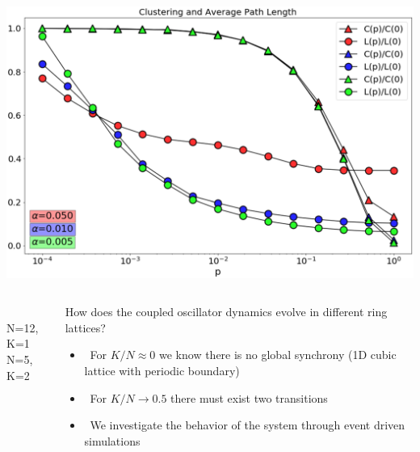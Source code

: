 \documentclass[serif,mathserif]{beamer}
\begin{document}
\begin{frame}
    \centering
    \includegraphics[height=0.85\textheight]{./small-world.eps}
\end{frame}

\begin{frame}
    \begin{columns}
        \begin{column}{0.4\textwidth}
            \\
            N=12, K=1
            \\
            N=5, K=2
        \end{column}
        \begin{column}{0.6\textwidth}
            How does the coupled oscillator dynamics evolve in different ring lattices?\\
            \vspace{0.25cm}
            \begin{itemize}
                \vspace{0.25cm}
                \item \ \pause For $K/N \approx 0$ we know there is no global synchrony (1D cubic lattice with periodic boundary)
                \vspace{0.25cm}
                \item \ \pause For $K/N\rightarrow 0.5$ there must exist two transitions
                \vspace{0.25cm}
                \item \ \pause We investigate the behavior of the system through event driven simulations
            \end{itemize}
        \end{column}
    \end{columns}
\end{frame}
\end{document}
